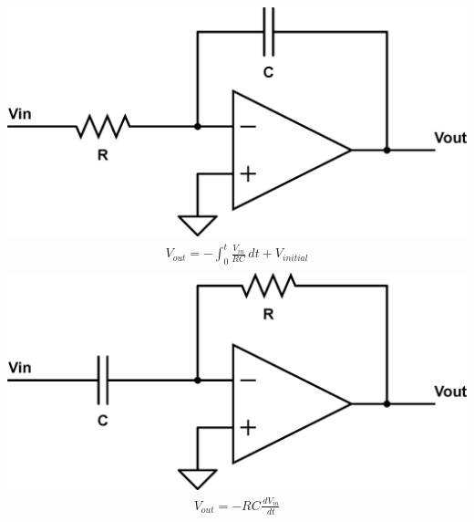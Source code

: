 \documentclass[10pt,letterpaper,english]{article}
\begin{document}
\begin{multicols}{2}
\includegraphics[scale=0.2]{opamp-integrator.eps}
\begin{align*}
V_{out} = -\int_0^t \frac{V_{in}}{RC} \,dt + V_{initial} \tag*{Integrator / Low-pass}\\
\end{align*}
\includegraphics[scale=0.2]{opamp-differentiator.eps}
\begin{align*}
V_{out} = -RC \frac{\,dV_{in}}{\,dt} \tag*{Differentiator / High-pass}\\
\end{align*}
\end{multicols}
\end{document}
